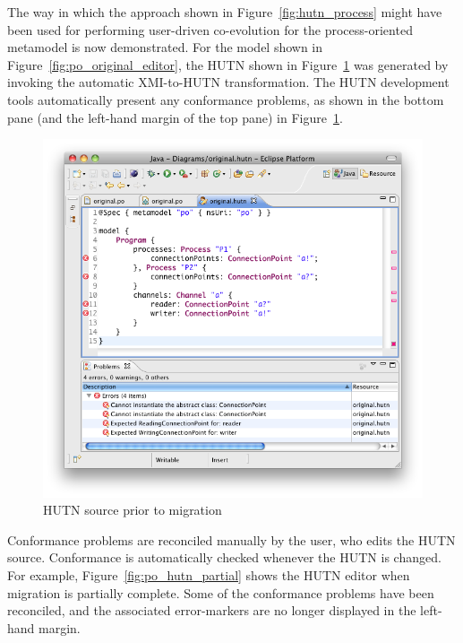 The way in which the approach shown in Figure~\ref{fig:hutn_process} might have been used for performing user-driven co-evolution for the process-oriented metamodel is now demonstrated. For the model shown in Figure~\ref{fig:po_original_editor}, the HUTN shown in Figure~\ref{fig:po_hutn} was generated by invoking the automatic XMI-to-HUTN transformation. The HUTN development tools automatically present any conformance problems, as shown in the bottom pane (and the left-hand margin of the top pane) in Figure~\ref{fig:po_hutn}.

\begin{figure}[htbp]
  \centering
  \includegraphics[width=13.5cm]{6.Evaluation/images/user_driven/po_hutn.png}
  \caption{HUTN source prior to migration}
  \label{fig:po_hutn}
\end{figure}

Conformance problems are reconciled manually by the user, who edits the HUTN source. Conformance is automatically checked whenever the HUTN is changed. For example, Figure~\ref{fig:po_hutn_partial} shows the HUTN editor when migration is partially complete. Some of the conformance problems have been reconciled, and the associated error-markers are no longer displayed in the left-hand margin.

